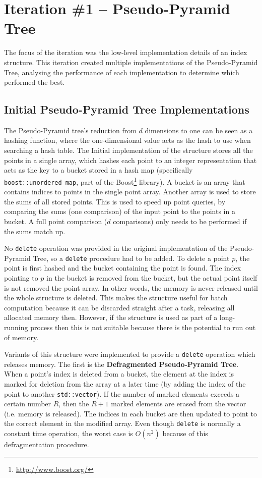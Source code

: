 \section{Iteration \#1 -- Pseudo-Pyramid Tree}

The focus of the iteration was the low-level implementation details of an index structure. This iteration created multiple implementations of the Pseudo-Pyramid Tree, analysing the performance of each implementation to determine which performed the best. 

\subsection{Initial Pseudo-Pyramid Tree Implementations}

The Pseudo-Pyramid tree's reduction from $d$ dimensions to one can be seen as a hashing function, where the one-dimensional value acts as the hash to use when searching a hash table. The Initial implementation of the structure stores all the points in a single array, which hashes each point to an integer representation that acts as the key to a bucket stored in a hash map (specifically \texttt{boost::unordered\_map}, part of the Boost\footnote{\url{http://www.boost.org/}} library). A bucket is an array that contains indices to points in the single point array. Another array is used to store the sums of all stored points. This is used to speed up point queries, by comparing the sums (one comparison) of the input point to the points in a bucket. A full point comparison ($d$ comparisons) only needs to be performed if the sums match up.

No \texttt{delete} operation was provided in the original implementation of the Pseudo-Pyramid Tree, so a \texttt{delete} procedure had to be added. To delete a point $p$, the point is first hashed and the bucket containing the point is found. The index pointing to $p$ in the bucket is removed from the bucket, but the actual point itself is not removed the point array. In other words, the memory is never released until the whole structure is deleted. This makes the structure useful for batch computation because it can be discarded straight after a task, releasing all allocated memory then. However, if the structure is used as part of a long-running process then this is not suitable because there is the potential to run out of memory.

Variants of this structure were implemented to provide a \texttt{delete} operation which releases memory. The first is the \textbf{Defragmented Pseudo-Pyramid Tree}. When a point's index is deleted from a bucket, the element at the index is marked for deletion from the array at a later time (by adding the index of the point to another \texttt{std::vector}). If the number of marked elements exceeds a certain number $R$, then the $R + 1$ marked elements are erased from the vector (i.e. memory is released). The indices in each bucket are then updated to point to the correct element in the modified array. Even though \texttt{delete} is normally a constant time operation, the worst case is $O(n^2)$ because of this defragmentation procedure.

